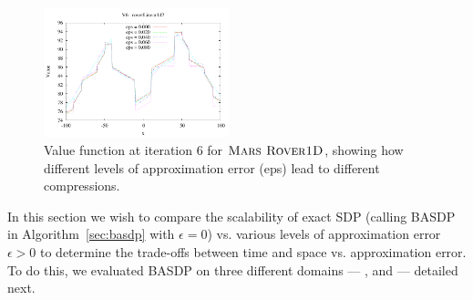 \label{sec:empirical}

\begin{figure}[t!]
\center
\includegraphics[width=0.48\textwidth]{Figures/rover1D/roverLinear1d2V6.pdf} 
\vspace{-3mm}
\caption{\footnotesize Value function at iteration 6 for $\textsc{Mars Rover1D}$, showing how different levels of approximation error (eps) lead to different compressions.}
\label{fig:rover1dv6} 
\vspace{-3mm}
\end{figure}

In this section we wish to compare the scalability of exact SDP
(calling BASDP in Algorithm~\ref{sec:basdp} with $\epsilon=0$)
vs. various levels of approximation error $\epsilon > 0$ to determine
the trade-offs between time and space vs. approximation error.
To do this, we evaluated BASDP on three different domains ---
\MarsRoverUni, \MarsRoverBi and \Invent --- detailed next.

